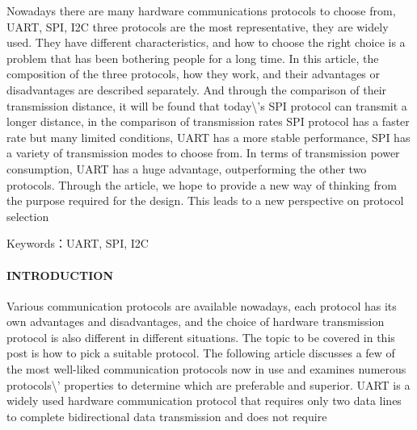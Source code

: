 \documentclass[12pt,a4paper]{article}
\numberwithin{equation}{section}
\begin{document}
Nowadays there are many hardware communications protocols to choose
from, UART, SPI, I2C three protocols are the most representative, they
are widely used. They have different characteristics, and how to choose
the right choice is a problem that has been bothering people for a long
time. In this article, the composition of the three protocols, how they
work, and their advantages or disadvantages are described separately.
And through the comparison of their transmission distance, it will be
found that today\textbackslash{}'s SPI protocol can transmit a longer distance, in the
comparison of transmission rates SPI protocol has a faster rate but many
limited conditions, UART has a more stable performance, SPI has a
variety of transmission modes to choose from. In terms of transmission
power consumption, UART has a huge advantage, outperforming the other
two protocols. Through the article, we hope to provide a new way of
thinking from the purpose required for the design. This leads to a new
perspective on protocol selection

Keywords：UART, SPI, I2C

\paragraph{INTRODUCTION}

Various communication protocols are available nowadays, each protocol
has its own advantages and disadvantages, and the choice of hardware
transmission protocol is also different in different situations. The
topic to be covered in this post is how to pick a suitable protocol. The
following article discusses a few of the most well-liked communication
protocols now in use and examines numerous protocols\textbackslash{}' properties to
determine which are preferable and superior. UART is a widely used
hardware communication protocol that requires only two data lines to
complete bidirectional data transmission and does not require
\end{document}
